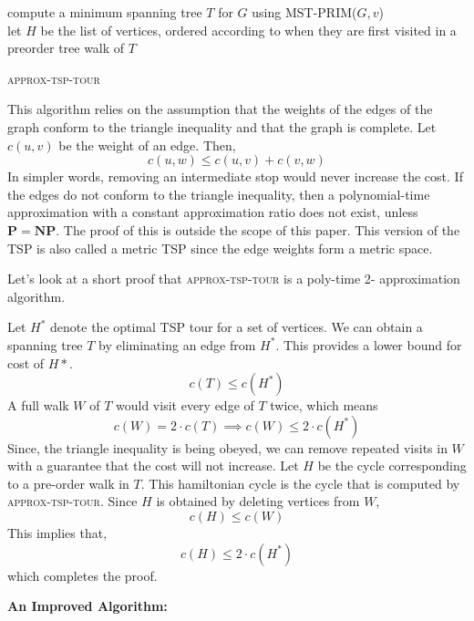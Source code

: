\documentclass[12pt]{report}
\begin{document}
    \begin{algorithm*}
      compute a minimum spanning tree $T$ for $G$ using \textsc{MST-PRIM}($G, v$) \\
      let $H$ be the list of vertices, ordered according to when they are first visited in a
      preorder tree walk of $T$ \\
  \caption{\textsc{approx-tsp-tour}}
  \end{algorithm*}
    
  This algorithm relies on the assumption that the weights of the edges of the graph conform to the triangle inequality and that the graph is complete.
  Let $c(u,v)$ be the weight of 
  an edge. Then, \[c(u,w) \leq c(u,v) + c(v, w) \]
  In simpler words, removing an intermediate stop would never increase the cost. If the edges do not conform to the triangle inequality, then a polynomial-time approximation
  with a constant approximation ratio does not exist, unless $\mathbf{P = NP}$. The proof of this
  is outside the scope of this paper. This version of the TSP is also called a metric TSP since 
  the edge weights form a metric space.   
  \par Let's look at a short proof that \textsc{approx-tsp-tour} is a poly-time 2- approximation algorithm. 
  \par
    Let $H^*$ denote the optimal TSP tour for a set of vertices. We can obtain a spanning tree $T$ by eliminating an edge from 
    $H^*$. This provides a lower bound for cost of $H*$. 
    \[c(T) \leq c(H^*)\] A full walk $W$ of $T$ would visit every edge of $T$ twice, which means   
    \[c(W) = 2\cdot c(T) \implies c(W) \leq 2\cdot c(H^*)\]
  Since, the triangle inequality is being obeyed, we can remove repeated visits in $W$ with a guarantee that 
  the cost will not increase.
  Let $H$ be the cycle corresponding to a pre-order walk in $T$. This hamiltonian cycle is the cycle that is computed by 
  \textsc{approx-tsp-tour}. Since $H$ is obtained by deleting vertices from $W$,
  \[c(H) \leq c(W)\]
  This implies that, \[c(H) \leq 2\cdot c(H^*)\] which completes the proof. 
  \par
    \newpage
  {{\textbf{An Improved Algorithm:}}}  \par
  
\end{document}
